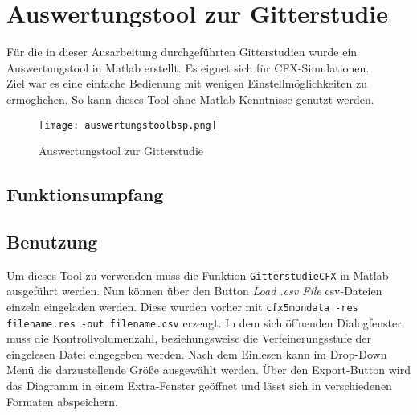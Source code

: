 \chapter{Auswertungstool zur Gitterstudie}
\label{cha:auswertungstool}
Für die in dieser Ausarbeitung durchgeführten Gitterstudien wurde ein Auswertungstool in Matlab erstellt. Es eignet sich für CFX-Simulationen.\\
Ziel war es eine einfache Bedienung mit wenigen Einstellmöglichkeiten zu ermöglichen. So kann dieses Tool ohne Matlab Kenntnisse genutzt werden.

\begin{figure}[htbp]
	\centering
	\label{fig:auswerungbsp}
	\texttt{[image: auswertungstoolbsp.png]}
	\caption{Auswertungstool zur Gitterstudie}
\end{figure}

\section{Funktionsumpfang}
\todo

\section{Benutzung}
Um dieses Tool zu verwenden muss die Funktion \texttt{GitterstudieCFX} in Matlab ausgeführt werden. Nun können über den Button \textit{Load .csv File} csv-Dateien einzeln eingeladen werden. Diese wurden vorher mit \texttt{cfx5mondata -res filename.res -out filename.csv} erzeugt. In dem sich öffnenden Dialogfenster muss die Kontrollvolumenzahl, beziehungsweise  die Verfeinerungsstufe der eingelesen Datei eingegeben werden. Nach dem Einlesen kann im Drop-Down Menü die darzustellende Größe ausgewählt werden. Über den Export-Button wird das Diagramm in einem Extra-Fenster geöffnet und lässt sich in verschiedenen Formaten abspeichern.
